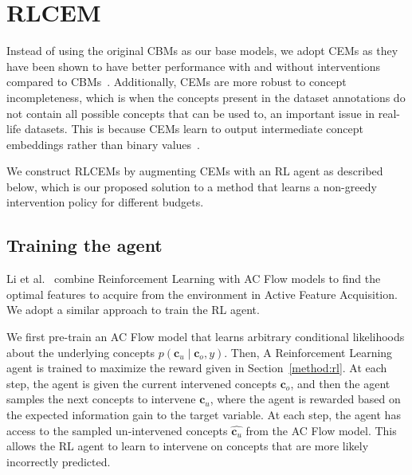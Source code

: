 \section{RLCEM}\label{method:rlcem}

Instead of using 
the original CBMs as our base models, we adopt CEMs as they have been shown to have
better performance with and without interventions compared to CBMs~\cite{cem}.
Additionally, CEMs are more robust to concept incompleteness, 
which is when the concepts present 
in the dataset annotations do not contain all possible concepts
that can be used to, an important issue in real-life datasets. This is because
CEMs learn to output intermediate
concept embeddings rather than binary values~\cite{cem}.

We construct RLCEMs by augmenting CEMs with an RL agent as 
described below, which is our proposed solution
to a method that learns a non-greedy intervention policy for different budgets.

\subsection{Training the agent}
Li et al.~\cite{gsmrl} combine Reinforcement Learning with 
AC Flow models to find the optimal features to acquire 
from the environment in Active Feature Acquisition. We
adopt a similar approach to train the RL agent.

We first pre-train an AC Flow model that learns 
arbitrary conditional likelihoods about the underlying
concepts $p(\mathbf{c}_u \mid \mathbf{c}_o, y)$. 
Then, A Reinforcement Learning agent is trained to maximize 
the reward given in Section~\ref{method:rl}. 
At each
step, the agent is given the current intervened concepts $\mathbf{c}_o$, 
and then the agent samples the next 
concepts to intervene $\mathbf{c}_u$, 
where the agent is rewarded based on the expected information gain
to the target variable.
At each step, the agent has access to the sampled un-intervened concepts $\hat{\mathbf{c}_u}$ 
from the AC Flow model. This allows the RL agent to learn to intervene on concepts that are 
more likely incorrectly predicted.

